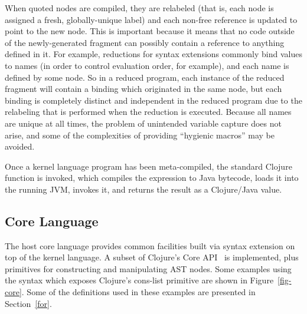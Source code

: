 When quoted nodes are compiled, they are relabeled (that is, each node is assigned a fresh, globally-unique label) and each non-free reference is updated to point to the new node. This is important because it means that no code outside of the newly-generated fragment can possibly contain a reference to anything defined in it. For example, reductions for syntax extensions commonly bind values to names (in order to control evaluation order, for example), and each name is defined by some  node. So in a reduced program, each instance of the reduced fragment will contain a binding which originated in the same node, but each binding is completely distinct and independent in the reduced program due to the relabeling that is performed when the reduction is executed. Because all names are unique at all times, the problem of unintended variable capture does not arise, and some of the complexities of providing ``hygienic macros''\cite{hygiene} may be avoided.

Once a kernel language program has been meta-compiled, the standard Clojure function  is invoked, which compiles the expression to Java bytecode, loads it into the running JVM, invokes it, and returns the result as a Clojure/Java value.


\subsection{Core Language}
The host core language provides common facilities built via syntax extension on top of the kernel language. 
A subset of Clojure's Core API~\cite{clojure-and} is implemented, plus primitives for constructing and manipulating AST nodes. Some examples using the syntax which exposes Clojure's cons-list primitive are shown in Figure~\ref{fig-core}. Some of the definitions used in these examples are presented in Section~\ref{for}.


